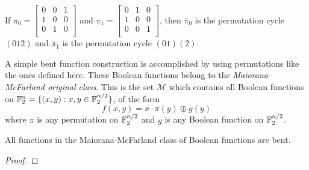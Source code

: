 \begin{example}
  If $\pi_0=\begin{bmatrix}
               0&0&1\\
               1&0&0\\
               0&1&0\\
             \end{bmatrix}$ and $\pi_1=
             \begin{bmatrix}
               0&1&0\\
               1&0&0\\
               0&0&1\\
             \end{bmatrix}$, then $\bar{\pi}_0$ is the permutation cycle $(012)$
             and $\bar{\pi}_1$ is the permutation cycle $(01)(2)$.
\end{example}
\par A simple bent function construction is accomplished by using permutations
like the ones defined here. These Boolean functions belong to the {\it
Maiorana-McFarland original class}. This is the set
$\mathcal{M}$ which contains all Boolean functions on
$\mathbb{F}_2^n=\{(x,y):x,y\in\mathbb{F}_2^{n/2}\}$, of the form
  \[
  f(x,y)=x\cdot\pi(y)\oplus g(y)
  \]
where $\pi$ is any permutation on $\mathbb{F}_2^{n/2}$ and $g$ is any Boolean
function on $\mathbb{F}_2^{n/2}$.

\begin{proposition}{\rm\cite{col:c06}}
\par All functions in the Maiorana-McFarland class of Boolean functions are
bent.
\end{proposition}

\begin{proof}

\end{proof}

